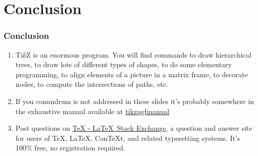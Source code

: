 %
%
\section{
  Conclusion
}

%
%
\begin{frame}
  \frametitle{
    Conclusion
  }

  \begin{enumerate}
  \item
    Ti$k$Z is an enormous program. You will find commands to draw hierarchical trees, to draw lots of different types of shapes, to do some elementary programming, to align elements of a picture in a matrix frame, to decorate nodes, to compute the intersections of paths, etc.
  \item
    If you conundrum is not addressed in these slides it's probably somewhere in the exhaustive manual available at \href{http://paws.wcu.edu/tsfoguel/tikzpgfmanual.pdf}{tikzpgfmanual}
  \item
    Post questions on \href{http://tex.stackexchange.com/}{TeX - \LaTeX\ Stack Exchange}, a question and answer site for users of TeX, \LaTeX, ConTeXt, and related typesetting systems. It's 100\% free, no registration required. 
  \end{enumerate}
  
\end{frame}
